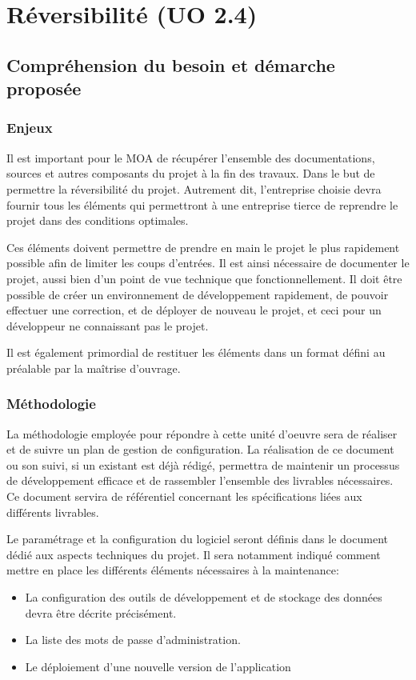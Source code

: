 	\section{Réversibilité (UO 2.4)}
	\subsection{Compréhension du besoin et démarche proposée}
	\subsubsection{Enjeux}
	Il est important pour le MOA de récupérer l’ensemble des documentations, sources et autres composants du projet à la fin des travaux. Dans le but de permettre la réversibilité du projet. Autrement dit, l’entreprise choisie devra fournir tous les éléments qui permettront à une entreprise tierce de reprendre le projet dans des conditions optimales. 
	
	Ces éléments doivent permettre de prendre en main le projet le plus rapidement possible afin de limiter les coups d’entrées. Il est ainsi nécessaire de documenter le projet, aussi bien d’un point de vue technique que fonctionnellement. Il doit être possible de créer un environnement de développement rapidement, de pouvoir effectuer une correction, et de déployer de nouveau le projet, et ceci pour un développeur ne connaissant pas le projet.
	
	Il est également primordial de restituer les éléments dans un format défini au préalable par la maîtrise d’ouvrage.
	
	\subsubsection{Méthodologie}
	La méthodologie employée pour répondre à cette unité d’oeuvre sera de réaliser et de suivre un plan de gestion de configuration. La réalisation de ce document ou son suivi, si un existant est déjà rédigé, permettra de maintenir un processus de développement efficace et de rassembler l’ensemble des livrables nécessaires. Ce document servira de référentiel concernant les spécifications liées aux différents livrables.
	
	Le paramétrage et la configuration du logiciel seront définis dans le document dédié aux aspects techniques du projet. Il sera notamment indiqué comment mettre en place les différents éléments nécessaires à la maintenance:
	
	\begin{itemize}
		\item La configuration des outils de développement et de stockage des données devra être décrite précisément. 
		\item La liste des mots de passe d’administration.
		\item Le déploiement d'une nouvelle version de l'application
	\end{itemize}
	
